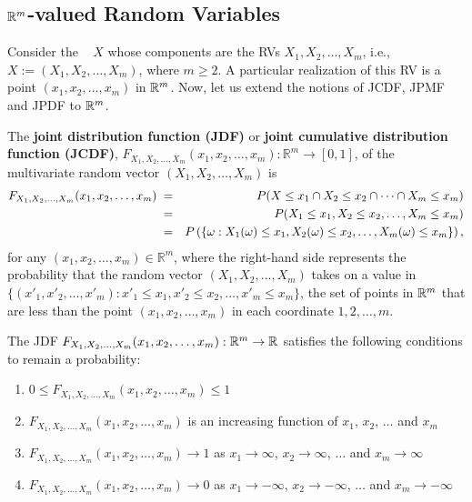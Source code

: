 \subsection{$\mathbb{R}^m$-valued Random Variables}

Consider the \rv~ $X$ whose components are the RVs $X_1,X_2,\ldots,X_m$, i.e., $X := (X_1,X_2,\ldots,X_m)$, where $m \geq 2$.  
A particular realization of this RV is a point $(x_1,x_2,\ldots,x_m)$ in $\mathbb{R}^m$.  
Now, let us extend the notions of JCDF, JPMF and JPDF to $\mathbb{R}^m$.  

\begin{definition}\label{Df:JmDF}
The {\bf joint distribution function (JDF)} or {\bf joint cumulative distribution function (JCDF)}, $F_{X_1,X_2,\ldots,X_m}(x_1,x_2,\ldots,x_m):\mathbb{R}^m\to [0,1]$, of the multivariate random vector $(X_1,X_2,\ldots,X_m)$ is
\begin{eqnarray}\label{E:jmDF}
F_{X_1,X_2,\ldots,X_m}(x_1,x_2,\ldots,x_m)\; 
&=& P(X\leq x_1 \cap X_2 \leq x_2 \cap \cdots \cap X_m \leq x_m)\notag\\ 
&=& P(X_1\leq x_1 , X_2 \leq x_2, \ldots, X_m \leq x_m)\\
&=& P\left( \{ \omega: X_1(\omega) \leq x_1, X_2(\omega) \leq x_2, \ldots, X_m(\omega) \leq x_m \} \right), \notag
\end{eqnarray}
for any $(x_1,x_2,\ldots,x_m) \in \mathbb{R}^m$, 
where the right-hand side represents the probability that the random vector $(X_1,X_2,\ldots,X_m)$ takes on a value in 
$\{(x'_1,x'_2,\ldots,x'_m): x'_1 \leq x_1, x'_2 \leq x_2, \ldots, x'_m \leq x_m\}$, the set of points in $\mathbb{R}^m$ that are less than the point $(x_1,x_2,\ldots,x_m)$ in each coordinate $1,2,\ldots,m$.
\end{definition}

The JDF $F_{X_1,X_2,\ldots,X_m}(x_1,x_2,\ldots,x_m):\mathbb{R}^m\to\mathbb{R}$ satisfies the following conditions to remain a probability: 
\begin{enumerate}
\item $0 \leq F_{X_1,X_2,\ldots,X_m}(x_1,x_2,\ldots,x_m) \leq 1$
\item $F_{X_1,X_2,\ldots,X_m}(x_1,x_2,\ldots,x_m)$ is an increasing function of $x_1$, $x_2$, $\ldots$ and $x_m$
\item $F_{X_1,X_2,\ldots,X_m}(x_1,x_2,\ldots,x_m) \to 1$ as $x_1\to \infty$, $x_2\to \infty$, $\ldots$ and $x_m\to \infty$
\item $F_{X_1,X_2,\ldots,X_m}(x_1,x_2,\ldots,x_m) \to 0$ as $x_1\to -\infty$, $x_2\to -\infty$, $\ldots$ and $x_m\to -\infty$
\end{enumerate}

